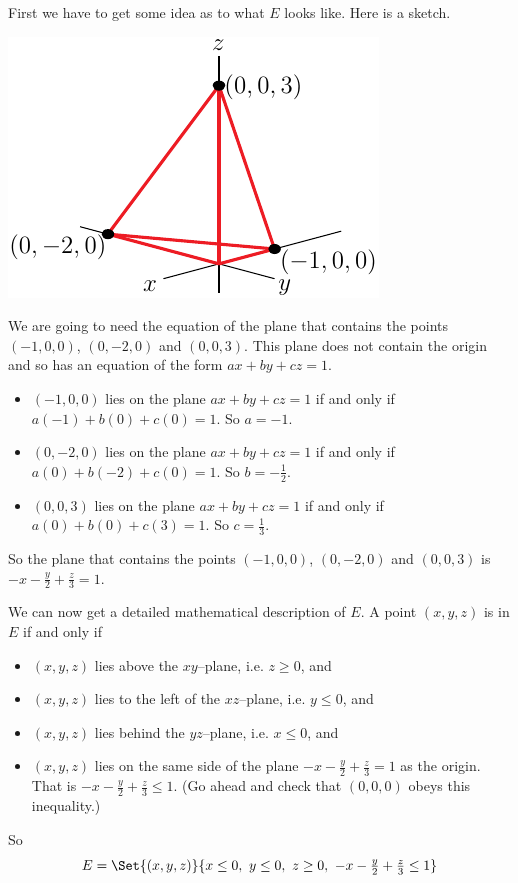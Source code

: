 \begin{solution}
First we have to get some idea as to what $E$ looks like.
Here is a sketch.
\begin{center}
     \includegraphics{fig/OE09A_8.pdf}
\end{center}
We are going to need the equation of the plane that contains the
points $(-1,0,0)$, $(0,-2,0)$ and $(0,0,3)$. This plane does not contain
the origin and so has an equation of the form $ax+by+cz=1$. 
\begin{itemize}
\item
$(-1,0,0)$ lies on the plane $ax+by+cz=1$ if and only if
$a(-1)+b(0)+c(0)=1$. So $a=-1$.
\item
$(0,-2,0)$ lies on the plane $ax+by+cz=1$ if and only if
$a(0)+b(-2)+c(0)=1$. So $b=-\frac{1}{2}$.
\item
$(0,0,3)$ lies on the plane $ax+by+cz=1$ if and only if
$a(0)+b(0)+c(3)=1$. So $c=\frac{1}{3}$.
\end{itemize}
So the plane that contains the points $(-1,0,0)$, $(0,-2,0)$ and $(0,0,3)$
is $-x-\frac{y}{2}+\frac{z}{3}=1$.

We can now get a detailed mathematical description of $E$.
A point $(x,y,z)$ is in $E$ if and only if
\begin{itemize}
\item
$(x,y,z)$ lies above the $xy$--plane, i.e. $z\ge 0$, and
\item
$(x,y,z)$ lies to the left of the $xz$--plane, i.e. $y\le 0$, and
\item
$(x,y,z)$ lies behind the $yz$--plane, i.e. $x\le 0$, and
\item
$(x,y,z)$ lies on the same side of the plane 
$-x-\frac{y}{2}+\frac{z}{3}=1$ as the origin.
That is  $-x-\frac{y}{2}+\frac{z}{3}\le 1$. (Go ahead and check
that $(0,0,0)$ obeys this inequality.)

\end{itemize}
So
\begin{equation*}
E=\Set{(x,y,z)}{x\le 0,\ y\le 0,\ z\ge 0,\ -x-\tfrac{y}{2}+\tfrac{z}{3}\le 1}
\end{equation*}


\end{solution}
